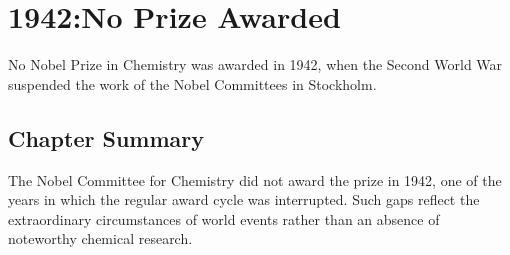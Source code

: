 \chapter{1942:No Prize Awarded}
\label{chap:chemistry1942}

No Nobel Prize in Chemistry was awarded in 1942, when the Second World War suspended the work of the Nobel Committees in Stockholm.

\section*{Chapter Summary}

The Nobel Committee for Chemistry did not award the prize in 1942, one of the years in which the regular award cycle was interrupted. Such gaps reflect the extraordinary circumstances of world events rather than an absence of noteworthy chemical research.
